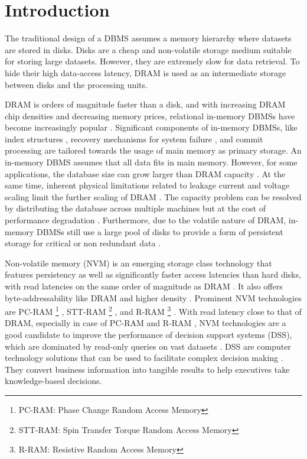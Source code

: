 \section{Introduction}
\noindent The traditional design of a DBMS assumes a memory hierarchy where datasets are stored in disks. Disks are a cheap and non-volatile storage medium suitable for storing large datasets. However, they are extremely slow for data retrieval. To hide their high data-access latency, DRAM is used as an intermediate storage between disks and the processing units.

DRAM is orders of magnitude faster than a disk, and with increasing DRAM chip densities and decreasing memory prices, relational in-memory DBMSs have become increasingly popular \cite{abraham2013scuba,farber2012sap,lindstrom2013ibm,barber2011blink,PeletonLink,pavlo2017self}. Significant components of in-memory DBMSs, like index structures \cite{larson2011sql,zhang2016reducing}, recovery mechanisms for system failure \cite{ongaro2011fast,diaconu2013hekaton}, and commit processing \cite{lee2001single} are tailored towards the usage of main memory as primary storage. An in-memory DBMS assumes that all data fits in main memory. However, for some applications, the database size can grow larger than DRAM capacity \cite{debrabant2014prolegomenon}. At the same time, inherent physical limitations related to leakage current and voltage scaling limit the further scaling of DRAM \cite{mandelman2002challenges,driskill2010latest}. The capacity problem can be resolved by distributing the database across multiple machines but at the cost of performance degradation \cite{debrabant2014prolegomenon}. Furthermore, due to the volatile nature of DRAM, in-memory DBMSs still use a large pool of disks to provide a form of persistent storage for critical or non redundant data \cite{abraham2013scuba,melnik2010dremel,plattner2011sanssoucidb,sikka2012efficient}.


Non-volatile memory (NVM) is an emerging storage class technology that features persistency as well as significantly faster access latencies than hard disks, with read latencies on the same order of magnitude as DRAM \cite{arulraj2017build}. It also offers byte-addressability like DRAM and higher density \cite{qureshi2009scalable,andrei2017sap}. Prominent NVM technologies are PC-RAM \footnote{PC-RAM: Phase Change Random Access Memory} \cite{raoux2008phase}, STT-RAM \footnote{STT-RAM: Spin Transfer Torque Random Access Memory} \cite{driskill2010latest}, and R-RAM \footnote{R-RAM: Resistive Random Access Memory} \cite{strukov2008missing}. With read latency close to that of DRAM, especially in case of PC-RAM and R-RAM \cite{arulraj2015let,chang2012limits}, NVM technologies are a good candidate to improve the performance of decision support systems (DSS), which are dominated by read-only queries on vast datasets \cite{hagmann2002real}. DSS are computer technology solutions that can be used to facilitate complex decision making \cite{shim2002past}. They convert business information into tangible results \cite{chaudhuri2001database} to help executives take knowledge-based decisions.

